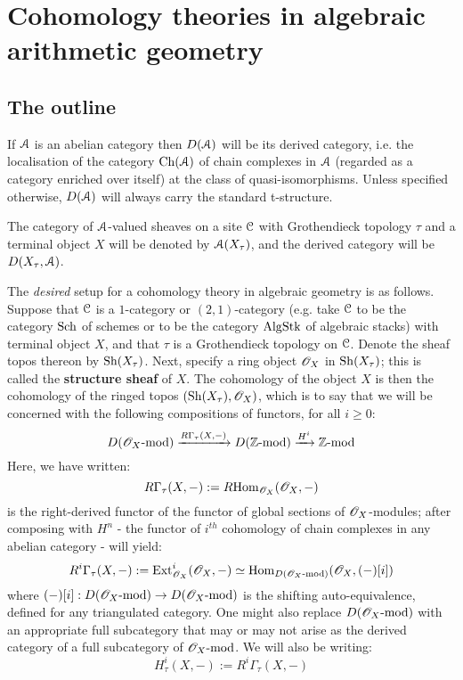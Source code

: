     \section{Cohomology theories in algebraic arithmetic geometry}
        \subsection{The outline}
            \begin{convention}
                If $\mathcal{A}$ is an abelian category then $D(\mathcal{A})$ will be its derived category, i.e. the localisation of the category $\mathrm{Ch}(\mathcal{A})$ of chain complexes in $\mathcal{A}$ (regarded as a category enriched over itself) at the class of quasi-isomorphisms. Unless specified otherwise, $D(\mathcal{A})$ will always carry the standard t-structure.
    
                The category of $\mathcal{A}$-valued sheaves on a site $\mathcal{C}$ with Grothendieck topology $\tau$ and a terminal object $X$ will be denoted by $\mathcal{A}(X_{\tau})$, and the derived category will be $D(X_{\tau}, \mathcal{A})$.
            \end{convention}
    
            The \textit{desired} setup for a cohomology theory in algebraic geometry is as follows. Suppose that $\mathcal{C}$ is a $1$-category or $(2, 1)$-category (e.g. take $\mathcal{C}$ to be the category $\mathrm{Sch}$ of schemes or to be the category $\mathrm{Alg}\mathrm{Stk}$ of algebraic stacks) with terminal object $X$, and that $\tau$ is a Grothendieck topology on $\mathcal{C}$. Denote the sheaf topos thereon by $\mathrm{Sh}(X_{\tau})$. Next, specify a ring object $\mathscr{O}_X$ in $\mathrm{Sh}(X_{\tau})$; this is called the \textbf{structure sheaf} of $X$. The cohomology of the object $X$ is then the cohomology of the ringed topos $( \mathrm{Sh}(X_{\tau}), \mathscr{O}_X )$, which is to say that we will be concerned with the following compositions of functors, for all $i \geq 0$:
                $$D(\mathscr{O}_X\text{-}\mathrm{mod}) \xrightarrow[]{R\Gamma_{\tau}(X, -)} D(\mathbb{Z}\text{-}\mathrm{mod}) \xrightarrow[]{H^i} \mathbb{Z}\text{-}\mathrm{mod}$$
            Here, we have written:
                $$R\Gamma_{\tau}(X, -) := R\mathrm{Hom}_{\mathscr{O}_X}(\mathscr{O}_X, -)$$
            is the right-derived functor of the functor of global sections of $\mathscr{O}_X$-modules; after composing with $H^n$ - the functor of $i^{th}$ cohomology of chain complexes in any abelian category - will yield:
                $$R^i\Gamma_{\tau}(X, -) := \mathrm{Ext}^i_{\mathscr{O}_X}(\mathscr{O}_X, -) \simeq \mathrm{Hom}_{D(\mathscr{O}_X\text{-}\mathrm{mod})}(\mathscr{O}_X, (-)[i])$$
            where $(-)[i]: D(\mathscr{O}_X\text{-}\mathrm{mod}) \to D(\mathscr{O}_X\text{-}\mathrm{mod})$ is the shifting auto-equivalence, defined for any triangulated category. One might also replace $D(\mathscr{O}_X\text{-}\mathrm{mod})$ with an appropriate full subcategory that may or may not arise as the derived category of a full subcategory of $\mathscr{O}_X\text{-}\mathrm{mod}$. We will also be writing:
                $$H^i_{\tau}(X, -) := R^i\Gamma_{\tau}(X, -)$$
        
